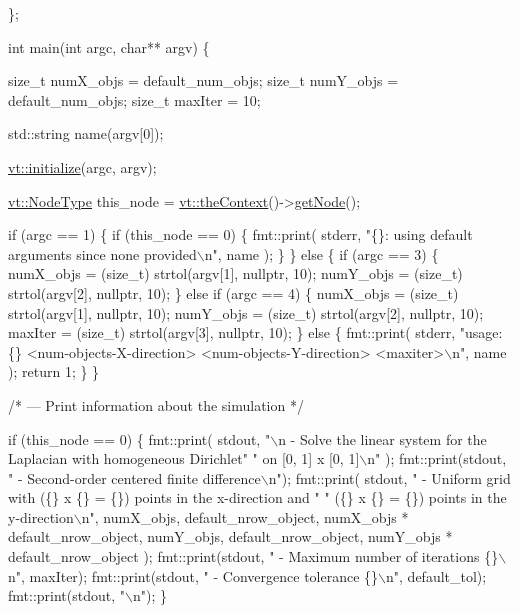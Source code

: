 \begin{DoxyCodeInclude}
\};


\textcolor{keywordtype}{int} main(\textcolor{keywordtype}{int} argc, \textcolor{keywordtype}{char}** argv) \{

  \textcolor{keywordtype}{size\_t} numX\_objs = default\_num\_objs;
  \textcolor{keywordtype}{size\_t} numY\_objs = default\_num\_objs;
  \textcolor{keywordtype}{size\_t} maxIter = 10;

  std::string name(argv[0]);

  \hyperlink{namespacevt_aaa266774ea8339c58be0202b00fafa62}{vt::initialize}(argc, argv);

  \hyperlink{namespacevt_a866da9d0efc19c0a1ce79e9e492f47e2}{vt::NodeType} this\_node = \hyperlink{namespacevt_a26551fe0e6e6a1371111df5b12c7e92c}{vt::theContext}()->\hyperlink{structvt_1_1ctx_1_1_context_a0d52c263ce8516546a67443d9a86fa5f}{getNode}();

  \textcolor{keywordflow}{if} (argc == 1) \{
    \textcolor{keywordflow}{if} (this\_node == 0) \{
      fmt::print(
        stderr, \textcolor{stringliteral}{"\{\}: using default arguments since none provided\(\backslash\)n"}, name
      );
    \}
  \} \textcolor{keywordflow}{else} \{
    \textcolor{keywordflow}{if} (argc == 3) \{
      numX\_objs = (size\_t) strtol(argv[1], \textcolor{keyword}{nullptr}, 10);
      numY\_objs = (size\_t) strtol(argv[2], \textcolor{keyword}{nullptr}, 10);
    \}
    \textcolor{keywordflow}{else} \textcolor{keywordflow}{if} (argc == 4) \{
      numX\_objs = (size\_t) strtol(argv[1], \textcolor{keyword}{nullptr}, 10);
      numY\_objs = (size\_t) strtol(argv[2], \textcolor{keyword}{nullptr}, 10);
      maxIter = (size\_t) strtol(argv[3], \textcolor{keyword}{nullptr}, 10);
    \}
    \textcolor{keywordflow}{else} \{
      fmt::print(
        stderr, \textcolor{stringliteral}{"usage: \{\} <num-objects-X-direction> <num-objects-Y-direction> <maxiter>\(\backslash\)n"},
        name
      );
      \textcolor{keywordflow}{return} 1;
    \}
  \}

  \textcolor{comment}{/* --- Print information about the simulation */}

  \textcolor{keywordflow}{if} (this\_node == 0) \{
    fmt::print(
      stdout, \textcolor{stringliteral}{"\(\backslash\)n - Solve the linear system for the Laplacian with homogeneous Dirichlet"}
      \textcolor{stringliteral}{" on [0, 1] x [0, 1]\(\backslash\)n"}
    );
    fmt::print(stdout, \textcolor{stringliteral}{" - Second-order centered finite difference\(\backslash\)n"});
    fmt::print(
      stdout, \textcolor{stringliteral}{" - Uniform grid with (\{\} x \{\} = \{\}) points in the x-direction and "}
      \textcolor{stringliteral}{" (\{\} x \{\} = \{\}) points in the y-direction\(\backslash\)n"},
      numX\_objs, default\_nrow\_object, numX\_objs * default\_nrow\_object,
      numY\_objs, default\_nrow\_object, numY\_objs * default\_nrow\_object
    );
    fmt::print(stdout, \textcolor{stringliteral}{" - Maximum number of iterations \{\}\(\backslash\)n"}, maxIter);
    fmt::print(stdout, \textcolor{stringliteral}{" - Convergence tolerance \{\}\(\backslash\)n"}, default\_tol);
    fmt::print(stdout, \textcolor{stringliteral}{"\(\backslash\)n"});
  \}


\end{DoxyCodeInclude}
